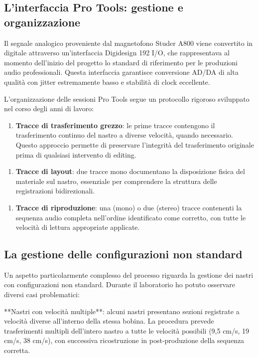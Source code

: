\subsection{L'interfaccia Pro Tools: gestione e organizzazione}
Il segnale analogico proveniente dal magnetofono Studer A800 viene convertito in digitale attraverso un'interfaccia Digidesign 192 I/O, che rappresentava al momento dell'inizio del progetto lo standard di riferimento per le produzioni audio professionali. Questa interfaccia garantisce conversione AD/DA di alta qualità con jitter estremamente basso e stabilità di clock eccellente.

L'organizzazione delle sessioni Pro Tools segue un protocollo rigoroso sviluppato nel corso degli anni di lavoro:

\begin{enumerate}
    \item \textbf{Tracce di trasferimento grezzo}: le prime tracce contengono il trasferimento continuo del nastro a diverse velocità, quando necessario. Questo approccio permette di preservare l'integrità del trasferimento originale prima di qualsiasi intervento di editing.
\end{enumerate}

\begin{enumerate}
    \item \textbf{Tracce di layout}: due tracce mono documentano la disposizione fisica del materiale sul nastro, essenziale per comprendere la struttura delle registrazioni bidirezionali.
\end{enumerate}

\begin{enumerate}
    \item \textbf{Tracce di riproduzione}: una (mono) o due (stereo) tracce contenenti la sequenza audio completa nell'ordine identificato come corretto, con tutte le velocità di lettura appropriate applicate\cite[p. 173]{pro:scelsitapes2007}.
\end{enumerate}
\subsection{La gestione delle configurazioni non standard}
Un aspetto particolarmente complesso del processo riguarda la gestione dei nastri con configurazioni non standard. Durante il laboratorio ho potuto osservare diversi casi problematici:

**Nastri con velocità multiple**: alcuni nastri presentano sezioni registrate a velocità diverse all'interno della stessa bobina. La procedura prevede trasferimenti multipli dell'intero nastro a tutte le velocità possibili (9,5 cm/s, 19 cm/s, 38 cm/s), con successiva ricostruzione in post-produzione della sequenza corretta.

